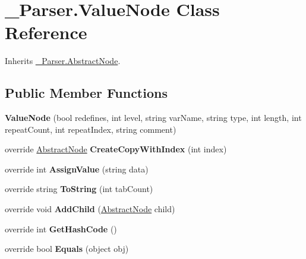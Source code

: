 \hypertarget{class__1920_parser_1_1_value_node}{}\section{\+\_\+Parser.\+Value\+Node Class Reference}
\label{class__1920_parser_1_1_value_node}


Inherits \hyperlink{class__1920_parser_1_1_abstract_node}{\+\_\+Parser.\+Abstract\+Node}.

\subsection*{Public Member Functions}
\begin{DoxyCompactItemize}
\item 
{\bfseries Value\+Node} (bool redefines, int level, string var\+Name, string type, int length, int repeat\+Count, int repeat\+Index, string comment)\hypertarget{class__1920_parser_1_1_value_node_a5070c8591d364b184fb2f7a83098d1df}{}\label{class__1920_parser_1_1_value_node_a5070c8591d364b184fb2f7a83098d1df}

\item 
override \hyperlink{class__1920_parser_1_1_abstract_node}{Abstract\+Node} {\bfseries Create\+Copy\+With\+Index} (int index)\hypertarget{class__1920_parser_1_1_value_node_a9419a8beace8e6eda482fc3a403daf4b}{}\label{class__1920_parser_1_1_value_node_a9419a8beace8e6eda482fc3a403daf4b}

\item 
override int {\bfseries Assign\+Value} (string data)\hypertarget{class__1920_parser_1_1_value_node_a21bed203f8124c630e8b804ebcd7b728}{}\label{class__1920_parser_1_1_value_node_a21bed203f8124c630e8b804ebcd7b728}

\item 
override string {\bfseries To\+String} (int tab\+Count)\hypertarget{class__1920_parser_1_1_value_node_ae2b512cbab33936e1b02d7a7acf3b4bd}{}\label{class__1920_parser_1_1_value_node_ae2b512cbab33936e1b02d7a7acf3b4bd}

\item 
override void {\bfseries Add\+Child} (\hyperlink{class__1920_parser_1_1_abstract_node}{Abstract\+Node} child)\hypertarget{class__1920_parser_1_1_value_node_a035c2fb0a7af286a4718e7215b2925a1}{}\label{class__1920_parser_1_1_value_node_a035c2fb0a7af286a4718e7215b2925a1}

\item 
override int {\bfseries Get\+Hash\+Code} ()\hypertarget{class__1920_parser_1_1_value_node_a77ab8503cab6fa67bc948c6ac7bbff09}{}\label{class__1920_parser_1_1_value_node_a77ab8503cab6fa67bc948c6ac7bbff09}

\item 
override bool {\bfseries Equals} (object obj)\hypertarget{class__1920_parser_1_1_value_node_a748e3fdade8e115cc73babbe19646351}{}\label{class__1920_parser_1_1_value_node_a748e3fdade8e115cc73babbe19646351}

\end{DoxyCompactItemize}
